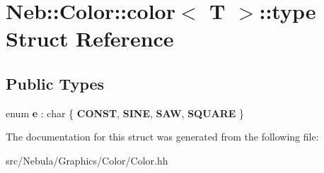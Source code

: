 \hypertarget{structNeb_1_1Color_1_1color_1_1type}{\section{Neb\-:\-:Color\-:\-:color$<$ T $>$\-:\-:type Struct Reference}
\label{structNeb_1_1Color_1_1color_1_1type}
}
\subsection*{Public Types}
\begin{DoxyCompactItemize}
\item 
enum {\bfseries e} \-: char \{ {\bfseries C\-O\-N\-S\-T}, 
{\bfseries S\-I\-N\-E}, 
{\bfseries S\-A\-W}, 
{\bfseries S\-Q\-U\-A\-R\-E}
 \}
\end{DoxyCompactItemize}


The documentation for this struct was generated from the following file\-:\begin{DoxyCompactItemize}
\item 
src/\-Nebula/\-Graphics/\-Color/Color.\-hh\end{DoxyCompactItemize}
